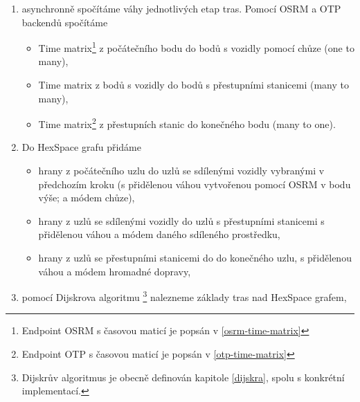 \documentclass[thesis=M,czech]{FITthesis}[2019/12/23]
\theoremstyle{plain}
\theoremstyle{definition}
\begin{document}
\begin{enumerate}
	\item asynchronně spočítáme váhy jednotlivých etap tras. Pomocí OSRM a OTP backendů spočítáme 
	\begin{itemize}
		\item Time matrix\footnote{Endpoint OSRM s časovou maticí je popsán v \ref{osrm-time-matrix}} z počátečního bodu do bodů s vozidly pomocí chůze (one to many),
		\item Time matrix z bodů s vozidly do bodů s přestupními stanicemi (many to many),
		\item Time matrix\footnote{Endpoint OTP s časovou maticí je popsán v \ref{otp-time-matrix}} z přestupních stanic do konečného bodu (many to one).

	\end{itemize}

	\item Do HexSpace grafu přidáme

	\begin{itemize}
		\item hrany z počátečního uzlu do uzlů se sdílenými vozidly vybranými v předchozím kroku (s přidělenou váhou vytvořenou pomocí OSRM v bodu výše; a módem chůze),
		\item hrany z uzlů se sdílenými vozidly do uzlů s přestupními stanicemi s přidělenou váhou a módem daného sdíleného prostředku,
		\item hrany z uzlů se přestupními stanicemi do do konečného uzlu, s přidělenou váhou a módem hromadné dopravy,
	\end{itemize}

	\item pomocí Dijskrova algoritmu \footnote{Dijskrův algoritmus je obecně definován kapitole \ref{dijskra}, spolu s konkrétní implementací.} nalezneme základy tras nad HexSpace grafem,


\end{enumerate}
\end{document}
